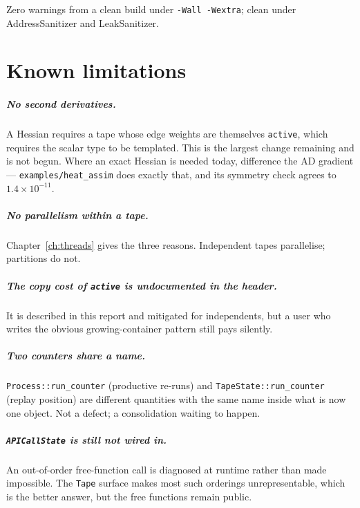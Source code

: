 \documentclass[11pt,a4paper]{report}
\newcommand{\code}[1]{\texttt{#1}}
\begin{document}
\noindent
Zero warnings from a clean build under \code{-Wall -Wextra}; clean under
AddressSanitizer and LeakSanitizer.

\chapter{Known limitations}

\paragraph{No second derivatives.} A Hessian requires a tape whose edge weights
are themselves \code{active}, which requires the scalar type to be templated.
This is the largest change remaining and is not begun. Where an exact Hessian is
needed today, difference the AD gradient --- \code{examples/heat\_assim} does
exactly that, and its symmetry check agrees to $1.4\times10^{-11}$.

\paragraph{No parallelism within a tape.} Chapter~\ref{ch:threads} gives the
three reasons. Independent tapes parallelise; partitions do not.

\paragraph{The copy cost of \code{active} is undocumented in the header.} It is
described in this report and mitigated for independents, but a user who writes
the obvious growing-container pattern still pays silently.

\paragraph{Two counters share a name.} \code{Process::run\_counter} (productive
re-runs) and \code{TapeState::run\_counter} (replay position) are different
quantities with the same name inside what is now one object. Not a defect; a
consolidation waiting to happen.

\paragraph{\code{APICallState} is still not wired in.} An out-of-order
free-function call is diagnosed at runtime rather than made impossible. The
\code{Tape} surface makes most such orderings unrepresentable, which is the
better answer, but the free functions remain public.
\end{document}
